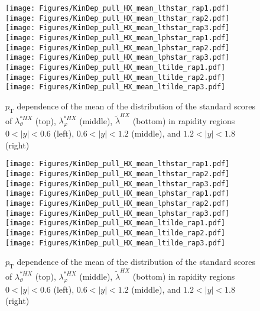 \documentclass[12pt]{article}
\newcommand{\pT}{p_\mathrm{T}}
\newcommand{\absy}{\left |  y \right |}
\newcommand{\lamtildeHX}{\tilde{\lambda}^{\scriptscriptstyle HX}}
\newcommand{\lamthstarHX}{\lambda^{* \scriptscriptstyle HX}_\vartheta}
\newcommand{\lamphstarHX}{\lambda^{* \scriptscriptstyle HX}_\varphi}
\begin{document}
\begin{figure}[htbp]
\centering
\texttt{[image: Figures/KinDep\_pull\_HX\_mean\_lthstar\_rap1.pdf]}
\texttt{[image: Figures/KinDep\_pull\_HX\_mean\_lthstar\_rap2.pdf]}
\texttt{[image: Figures/KinDep\_pull\_HX\_mean\_lthstar\_rap3.pdf]}
\texttt{[image: Figures/KinDep\_pull\_HX\_mean\_lphstar\_rap1.pdf]}
\texttt{[image: Figures/KinDep\_pull\_HX\_mean\_lphstar\_rap2.pdf]}
\texttt{[image: Figures/KinDep\_pull\_HX\_mean\_lphstar\_rap3.pdf]}
\texttt{[image: Figures/KinDep\_pull\_HX\_mean\_ltilde\_rap1.pdf]}
\texttt{[image: Figures/KinDep\_pull\_HX\_mean\_ltilde\_rap2.pdf]}
\texttt{[image: Figures/KinDep\_pull\_HX\_mean\_ltilde\_rap3.pdf]}
\caption{$\pT$ dependence of the mean of the distribution of the standard scores
of $\lamthstarHX$ (top), $\lamphstarHX$ (middle), $\lamtildeHX$ (bottom) in rapidity
regions $0<\absy<0.6$ (left), $0.6<\absy<1.2$ (middle), and $1.2<\absy<1.8$ (right)}
\end{figure}
\clearpage


\begin{figure}[htbp]
\centering
\texttt{[image: Figures/KinDep\_pull\_HX\_mean\_lthstar\_rap1.pdf]}
\texttt{[image: Figures/KinDep\_pull\_HX\_mean\_lthstar\_rap2.pdf]}
\texttt{[image: Figures/KinDep\_pull\_HX\_mean\_lthstar\_rap3.pdf]}
\texttt{[image: Figures/KinDep\_pull\_HX\_mean\_lphstar\_rap1.pdf]}
\texttt{[image: Figures/KinDep\_pull\_HX\_mean\_lphstar\_rap2.pdf]}
\texttt{[image: Figures/KinDep\_pull\_HX\_mean\_lphstar\_rap3.pdf]}
\texttt{[image: Figures/KinDep\_pull\_HX\_mean\_ltilde\_rap1.pdf]}
\texttt{[image: Figures/KinDep\_pull\_HX\_mean\_ltilde\_rap2.pdf]}
\texttt{[image: Figures/KinDep\_pull\_HX\_mean\_ltilde\_rap3.pdf]}
\caption{$\pT$ dependence of the mean of the distribution of the standard scores
of $\lamthstarHX$ (top), $\lamphstarHX$ (middle), $\lamtildeHX$ (bottom) in rapidity
regions $0<\absy<0.6$ (left), $0.6<\absy<1.2$ (middle), and $1.2<\absy<1.8$ (right)}
\end{figure}
\clearpage
\end{document}
